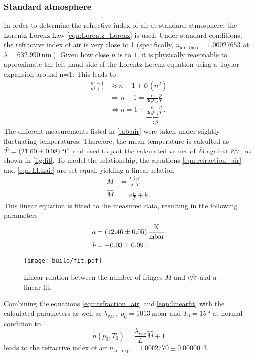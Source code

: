 \subsubsection{Standard atmosphere}
\label{sec:LorentzLorenzLaw}
In order to determine the refrective index of air at standard atmosphere, the Lorentz-Lorenz Law \ref{eqn:Lorentz_Lorenz} is used.
Under standard conditions, the refractive index of air is very close to 1 (specifically, $n_{\text{air, theo}}=1.00027653$ at $\lambda=\SI{632.990}{\nano\meter}$ \cite{refractiveIndex}). Given how close $n$ is to $1$, it is physically reasonable to approximate the left-hand side of the Lorentz-Lorenz equation using a Taylor expansion around n=1: This leads to 
\begin{align}
    \frac{n^2 -1}{n^2 +2} &\approx n-1  + \mathcal{O} (n^2)\nonumber\\
    &\Rightarrow n-1 = \frac{\alpha}{3 \epsilon _0 k_B} \frac{p}{T} \nonumber\\
    &\Leftrightarrow n = 1  + \underbrace{\frac{\alpha}{3 \epsilon _0 k_B}}_{=:\beta} \frac{p}{T} \label{eqn:LLLair}\,.
\end{align}
The different measurements listed in \autoref{tab:air} were taken under slightly fluctuating temperatures. Therefore, the mean temperature is calculted as $\bar{T}=\SI{21.60\pm0.08}{\celsius}$ and used to plot the calculated values of $\bar{M}$ against $\sfrac{p}{\bar{T}}$, as shown in \autoref{fig:fit}.
To model the relationship, the equations \ref{eqn:refraction_air} and \ref{eqn:LLLair} are set equal, yielding a linear relation
\begin{align}
    M &= \frac{L \beta}{\lambda}\frac{p}{T} \nonumber\\
    \hat{M} &= a \frac{p}{T}+b\,. \label{eqn:linearfit}
\end{align}
This linear equation is fitted to the measured data, resulting in the following parameters
\begin{align*}
    a &= \SI{12.46\pm0.05}{\kelvin\per\milli\bar}\\
    b &= -0.03\pm0.09\,.
\end{align*}
\begin{figure}[H]
    \centering
    \texttt{[image: build/fit.pdf]}
    \caption{Linear relation between the number of fringes $M$ and $\sfrac{p}{T}$ and a linear fit.}
    \label{fig:fit}
\end{figure}
Combining the equations \ref{eqn:refraction_air} and \ref{eqn:linearfit} with the calculated parameters as well as $\lambda_{\text{vac}},\,\,p_0 =\SI{1013}{\milli\bar}$ and $T_0 = \SI{15}{\degree}$ at normal condition to
$$
n(p_0, T_0) = \frac{\lambda_{\text{vac}}}{L} \hat{M} +1$$ 
leads to the refractive index of air $n_{\text{air, exp}} = 1.0002770\pm0.0000013$.